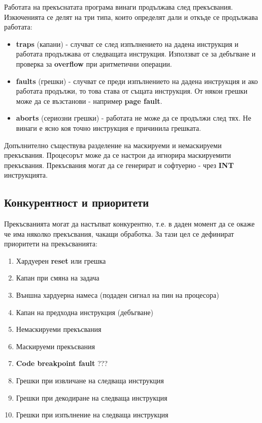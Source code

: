 \documentclass[fleqn,12pt]{article}
\begin{document}
Работата на прекъснатата програма винаги продължава след прекъсвания. Изкюченията се делят на три типа, 
които определят дали и откъде се продължава работата:
\begin{itemize}
    \item \textbf{traps} (капани) - случват се след изпълнението на дадена инструкция и работата продължава от следващата инструкция.
    Използват се за дебъгване и проверка за \textbf{overflow} при аритметични операции.
    \item \textbf{faults} (грешки) - случват се преди изпълнението на дадена инструкция и ако работата продължи, то това става 
    от същата инструкция. От някои грешки може да се възстанови - например \textbf{page fault}.
    \item \textbf{aborts} (сериозни грешки) - работата не може да се продължи след тях. Не винаги е ясно коя точно инструкция е причинила грешката.
\end{itemize}

Допълнително съществува разделение на маскируеми и немаскируеми прекъсвания. Процесорът може да се настрои да игнорира маскируемити прекъсвания.
Прекъсвания могат да се генерират и софтуерно - чрез \textbf{INT} инструкцията.

\subsection{Конкурентност и приоритети}
Прекъсванията могат да настъпват конкурентно, т.е. в даден момент да се окаже че има няколко прекъсвания, чакащи обработка.
За тази цел се дефинират приоритети на прекъсванията:
\begin{enumerate}
    \item Хардуерен \textbf{reset} или грешка
    \item Капан при смяна на задача
    \item Външна хардуерна намеса (подаден сигнал на пин на процесора)
    \item Капан на предходна инструкция (дебъгване)
    \item Немаскируеми прекъсвания
    \item Маскируеми прекъсвания
    \item \textbf{Code breakpoint fault} ???
    \item Грешки при извличане на следваща инструкция
    \item Грешки при декодиране на следваща инструкция
    \item Грешки при изпълнение на следваща инструкция
\end{enumerate}
\end{document}
